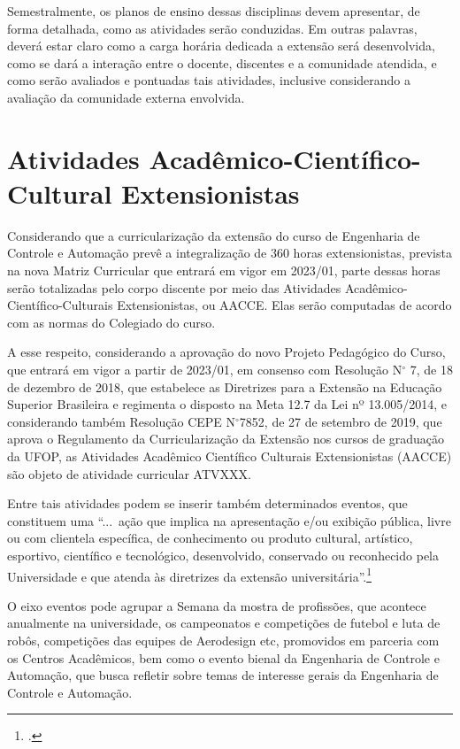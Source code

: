 \documentclass[
	12pt,				%
	openright,			%
	oneside,			%
	a4paper,			%
	english,			%
	brazil				%
	]{abntex2}
\begin{document}
\begin{itemize}
Semestralmente, os planos de ensino dessas disciplinas devem apresentar, de forma detalhada, como as atividades serão conduzidas. Em outras palavras, deverá estar claro como a carga horária dedicada a extensão será desenvolvida, como se dará a interação entre o docente, discentes e a comunidade atendida, e como serão avaliados e pontuadas tais atividades, inclusive considerando a avaliação da comunidade externa envolvida.    
\end{itemize}

\section{Atividades Acadêmico-Científico-Cultural Extensionistas}

Considerando que a curricularização da extensão do curso de Engenharia de Controle e Automação prevê a integralização de 360 horas extensionistas, prevista na nova Matriz Curricular que entrará em vigor em 2023/01, parte dessas horas serão totalizadas pelo corpo discente por meio das Atividades Acadêmico-Científico-Culturais Extensionistas, ou AACCE. Elas serão computadas de acordo com as normas do Colegiado do curso.

A esse respeito, considerando a aprovação do novo Projeto Pedagógico do Curso, que entrará em vigor a partir de 2023/01, em consenso com Resolução N$^\circ$ 7, de 18 de dezembro de 2018, que estabelece as Diretrizes para a Extensão na Educação Superior Brasileira e regimenta o disposto na Meta 12.7 da Lei nº 13.005/2014, e considerando também Resolução CEPE N$^\circ$7852, de 27 de setembro de 2019, que aprova o Regulamento da Curricularização da Extensão nos cursos de graduação da UFOP, as Atividades Acadêmico Científico Culturais Extensionistas (AACCE) são objeto de atividade curricular ATVXXX.

Entre tais atividades podem se inserir também determinados eventos, que constituem uma ``...~ação que implica na apresentação e/ou exibição pública, livre ou com clientela específica, de conhecimento ou produto cultural, artístico, esportivo, científico e tecnológico, desenvolvido, conservado ou reconhecido pela Universidade e que atenda às diretrizes da extensão universitária''.\footcite{manual-ppc-ufop}

O eixo eventos pode agrupar a Semana da mostra de profissões, que acontece anualmente na universidade, os campeonatos e competições de futebol e luta de robôs, competições das equipes de Aerodesign etc, promovidos em parceria com os Centros Acadêmicos, bem como o evento bienal da Engenharia de Controle e Automação, que busca refletir sobre temas de interesse gerais da Engenharia de Controle e Automação.
\end{document}
